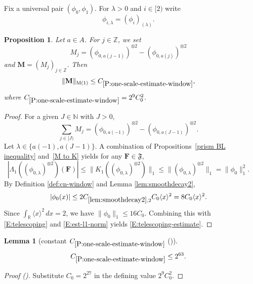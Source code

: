 \documentclass[12pt,reqno]{amsart}
\newcommand{\auto}{{({\tiny\faCar})}}
\theoremstyle{plain}
\newtheorem{lemma}[theorem]{Lemma}
\newtheorem{proposition}[theorem]{Proposition}
\numberwithin{equation}{section}
\theoremstyle{remark}
\newcommand{\using}[1]{}
\newcommand{\Z}{{\mathbb Z}}
\newcommand{\R}{{\mathbb R}}
\begin{document}
Fix a universal pair $(\phi_0,\phi_1)$. For $\lambda>0$ and $i\in[2)$ write
\begin{equation}\label{auto:rescaled-window-continuous-notation} \phi_{i,\lambda} = (\phi_i)_{(\lambda)}. \end{equation}

\begin{proposition}\label{P:one-scale-estimate-window}\using{prism BL inequality}\using{M to K}\using{lem:smoothdecay2}
Let $a\in A$. For $j\in \Z$, we set
\begin{equation}\label{auto:one-scale-window-kernel}
M_j=(\phi_{0,a(j-1)})^{\otimes 2} - (\phi_{0,a(j)})^{\otimes 2}
\end{equation}
and $\mathbf{M}=(M_j)_{j\in \Z}$. Then
\begin{equation}\label{E:telescoping-estimate}
\|\mathbf{M}\|_{\rm M(1)} \leq C_{\ref{P:one-scale-estimate-window}},
\end{equation}
where $C_{\ref{P:one-scale-estimate-window}}=2^9C_0^2$.


\end{proposition}

\begin{proof}
For a given $J\in \mathbb N$ with $J>0$,
\begin{equation}\label{E:telescoping}
\sum_{j\in [J)} M_j=(\phi_{0,a(-1)})^{\otimes 2}-(\phi_{0,a(J-1)})^{\otimes 2}.
\end{equation}
Let $\lambda \in \{a(-1), a(J-1)\}$.
A combination of Propositions~\ref{prism BL inequality} and~\ref{M to K} yields for any $\mathbf{F} \in \mathfrak{F}$,
\begin{equation}\label{E:est-l1-norm}
|\Lambda_1 ((\phi_{0,\lambda})^{\otimes 2})(\mathbf{F})| \leq
\|K_1((\phi_{0,\lambda})^{\otimes 2})\|_1 \leq\|(\phi_{0,\lambda})^{\otimes 2}\|_1
=\|\phi_0\|_1^2.
\end{equation}
By Definition \ref{def:cn-window} and Lemma \ref{lem:smoothdecay2},
\begin{equation}\label{E:est-of-l1-norm}
|\phi_0(x)|
\le 2C_{\ref{lem:smoothdecay2},2}C_0\langle x\rangle^2
=8C_0\langle x\rangle^2.
\end{equation}
Since $\int_\R\langle x\rangle^2\,dx=2$, we have $\|\phi_0\|_1\le16C_0$. Combining this with \eqref{E:telescoping} and \eqref{E:est-l1-norm} yields \eqref{E:telescoping-estimate}.
\end{proof}

\begin{lemma}[constant $C_{\ref{P:one-scale-estimate-window}}$ \auto]\label{auto:constant-one-scale-window}
\begin{equation}\label{auto:constant-one-scale-window-bound}
C_{\ref{P:one-scale-estimate-window}}\le2^{63}.
\end{equation}
\end{lemma}
\begin{proof}[Proof \auto]
Substitute $C_0=2^{27}$ in the defining value $2^9C_0^2$.
\end{proof}
\end{document}
